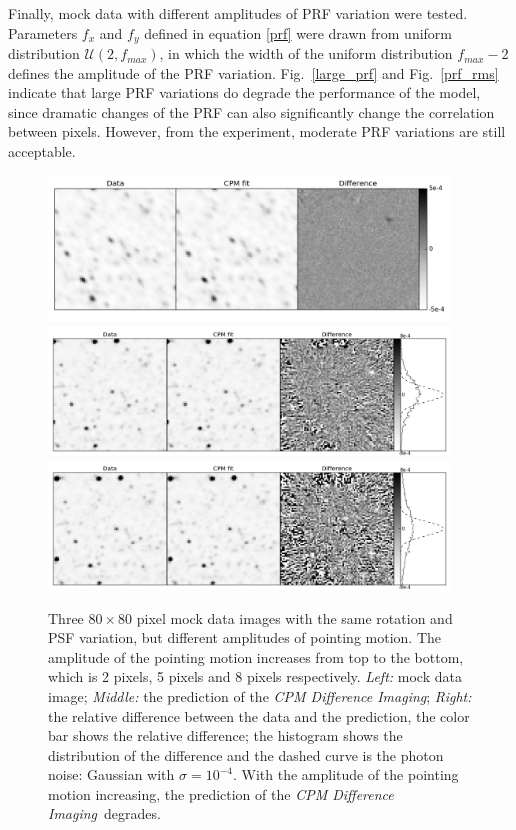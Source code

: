 \documentclass[12pt, preprint]{aastex}
\newcommand{\project}[1]{\textsl{#1}}
\newcommand{\cpmdiff}{\project{CPM Difference Imaging}}
\begin{document}
Finally, mock data with different amplitudes of PRF variation were tested.
Parameters $f_x$ and $f_y$ defined in equation \ref{prf} were drawn from uniform distribution ${\mathcal {U}}(2,f_{max})$, in which the width of the uniform distribution $f_{max}-2$ defines the amplitude of the PRF variation.
Fig.~\ref{large_prf} and Fig.~\ref{prf_rms} indicate that large PRF variations do degrade the performance of the model, since dramatic changes of the PRF can also significantly change the correlation between pixels.
However, from the experiment, moderate PRF variations are still acceptable. 

\begin{figure}[p]
\begin{center}
\includegraphics[width=0.95\textwidth]{f7a}
\includegraphics[width=0.95\textwidth]{f7b}
\includegraphics[width=0.95\textwidth]{f7c}
\end{center}
\caption{
  \label{large_motion}
  Three $80\times 80$ pixel mock data images with the same rotation and PSF variation, but different amplitudes of pointing motion. The amplitude of the pointing motion increases from top to the bottom, which is 2 pixels, 5 pixels and 8 pixels respectively. 
  \emph{Left:} mock data image;
  \emph{Middle:} the prediction of the \cpmdiff;
  \emph{Right:} the relative difference between the data and the prediction, the color bar shows the relative difference; the histogram shows the distribution of the difference and the dashed curve is the photon noise: Gaussian with $\sigma = 10^{-4}$. 
  With the amplitude of the pointing motion increasing, the prediction of the \cpmdiff\ degrades.
}
\end{figure}
\end{document}
